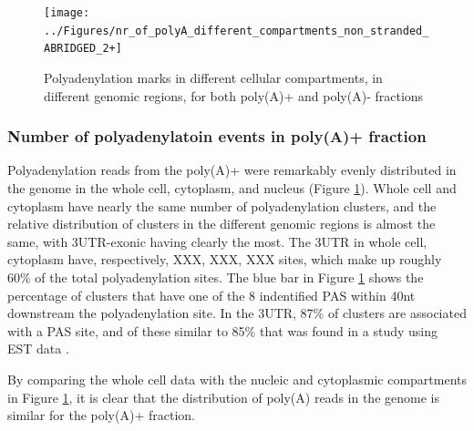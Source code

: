\documentclass[a4paper]{article}
\begin{document}
\begin{figure}[h]
	\centering
		\texttt{[image: ../Figures/nr\_of\_polyA\_different\_compartments\_non\_stranded\_ABRIDGED\_2+]}
	\caption{Polyadenylation marks in different cellular compartments, in
	different genomic regions, for both poly(A)+ and poly(A)- fractions}
	\label{fig:region_counts}
\end{figure}
\subsubsection{Number of polyadenylatoin events in poly(A)+ fraction}
Polyadenylation reads from the poly(A)+ were remarkably evenly distributed in
the genome in the whole cell, cytoplasm, and nucleus (Figure
\ref{fig:region_counts}). Whole cell and cytoplasm have nearly the same number
of polyadenylation clusters, and the relative distribution of clusters in the
different genomic regions is almost the same, with 3UTR-exonic having clearly
the most. The 3UTR in whole cell, cytoplasm have, respectively, XXX, XXX, XXX
sites, which make up roughly 60\% of the total polyadenylation
sites. The blue bar in Figure \ref{fig:region_counts} shows the percentage of
clusters that have one of the 8 indentified PAS \cite{} within 40nt downstream
the polyadenylation site. In the 3UTR, 87\% of clusters are associated with a
PAS site, and of these similar to 85\% that was found in a study using EST data
\cite{}.


By comparing the whole cell data with the  nucleic
and cytoplasmic compartments in Figure \ref{fig:region_counts}, it is clear
that the distribution of poly(A) reads in the genome is similar for the
poly(A)+ fraction.

\end{document}
